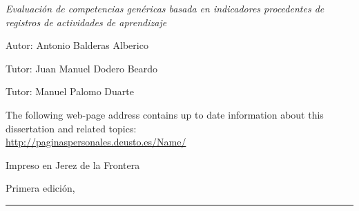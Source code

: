 
\thispagestyle{empty}

\hfill

\vfill

\medskip


\noindent
\textit{
Evaluación de competencias genéricas basada en indicadores procedentes de registros de actividades de aprendizaje
}




Autor: Antonio Balderas Alberico

Tutor: Juan Manuel Dodero Beardo

Tutor: Manuel Palomo Duarte



\vfill

\vfill

\noindent
The following web-page address contains up to date information about this dissertation and related topics: \\
\url{http://paginaspersonales.deusto.es/Name/}


\noindent
Impreso en Jerez de la Frontera

\noindent
Primera edición, 
\monthname \ \the\year

\vspace{1cm}
\hrule
\bigskip

\cleardoublepage

%
%
%
%
%
%

